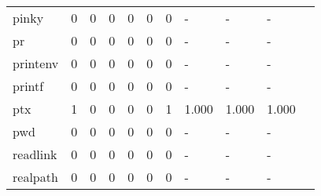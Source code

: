 \begin{longtable}{lp{1.10cm}p{1.10cm}p{1.10cm}p{1.10cm}p{1.10cm}p{1.10cm}p{1.10cm}p{1.10cm}p{1.10cm}p{1.10cm}}
pinky     &                      0 &                                  0 &                                 0 &                                0 &                                 0 &                               0 &                              - &                                     - &                                   - \\
pr        &                      0 &                                  0 &                                 0 &                                0 &                                 0 &                               0 &                              - &                                     - &                                   - \\
printenv  &                      0 &                                  0 &                                 0 &                                0 &                                 0 &                               0 &                              - &                                     - &                                   - \\
printf    &                      0 &                                  0 &                                 0 &                                0 &                                 0 &                               0 &                              - &                                     - &                                   - \\
ptx       &                      1 &                                  0 &                                 0 &                                0 &                                 0 &                               1 &                          1.000 &                                 1.000 &                               1.000 \\
pwd       &                      0 &                                  0 &                                 0 &                                0 &                                 0 &                               0 &                              - &                                     - &                                   - \\
readlink  &                      0 &                                  0 &                                 0 &                                0 &                                 0 &                               0 &                              - &                                     - &                                   - \\
realpath  &                      0 &                                  0 &                                 0 &                                0 &                                 0 &                               0 &                              - &                                     - &                                   - \\

\end{longtable}
